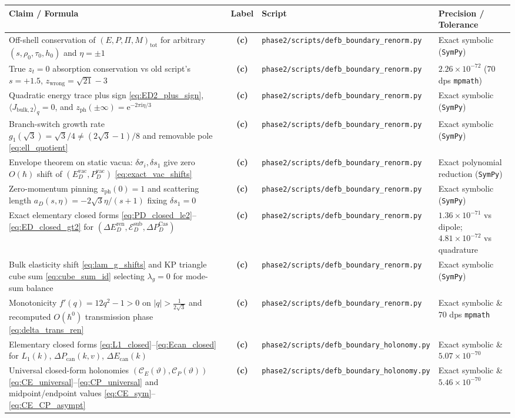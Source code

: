 \documentclass[11pt,a4paper]{article}
\theoremstyle{remark}
\newcommand{\hb}{\hbar}
\newcommand{\ii}{\mathrm{i}}
\newcommand{\ee}{\mathrm{e}}
\newcommand{\Lc}{\textbf{(c)}}
\newcommand{\sren}{\texttt{phase2/\allowbreak scripts/\allowbreak defb\_\allowbreak boundary\_\allowbreak renorm.py}}
\newcommand{\shol}{\texttt{phase2/\allowbreak scripts/\allowbreak defb\_\allowbreak boundary\_\allowbreak holonomy.py}}
\begin{document}
\begin{longtable}{@{}L{5.6cm}cL{3.8cm}L{4.8cm}@{}}
\toprule
Claim / Formula & Label & Script & Precision / Tolerance \\\midrule\endhead
Off-shell conservation of $(E,P,\Pi,M)_{\mathrm{tot}}$ for arbitrary $(s,\rho_0,\tau_0,h_0)$ and $\eta=\pm 1$ & \Lc & \sren & Exact symbolic (\texttt{SymPy}) \\
True $z_t=0$ absorption conservation vs old script's $s=+1.5$, $z_{\mathrm{wrong}}=\sqrt{21}-3$ & \Lc & \sren & $2.26\times 10^{-72}$ ($70$ dps \texttt{mpmath}) \\
Quadratic energy trace plus sign \eqref{eq:ED2_plus_sign}, $\langle J_{\mathrm{bulk},2}\rangle_q=0$, and $z_{\mathrm{ph}}(\pm\infty)=\ee^{-2\pi\ii\eta/3}$ & \Lc & \sren & Exact symbolic (\texttt{SymPy}) \\
Branch-switch growth rate $g_1(\sqrt{3})=\sqrt{3}/4 \ne (2\sqrt{3}-1)/8$ and removable pole \eqref{eq:ell_quotient} & \Lc & \sren & Exact symbolic (\texttt{SymPy}) \\
Envelope theorem on static vacua: $\delta\sigma_i,\delta s_1$ give zero $O(\hb)$ shift of $(E_D^{\mathrm{vac}},P_D^{\mathrm{vac}})$ \eqref{eq:exact_vac_shifts} & \Lc & \sren & Exact polynomial reduction (\texttt{SymPy}) \\
Zero-momentum pinning $z_{\mathrm{ph}}(0)=1$ and scattering length $a_D(s,\eta)=-2\sqrt{3}\eta/(s+1)$ fixing $\delta s_1=0$ & \Lc & \sren & Exact symbolic (\texttt{SymPy}) \\
Exact elementary closed forms \eqref{eq:PD_closed_le2}--\eqref{eq:ED_closed_gt2} for $(\Delta E_D^{\mathrm{ren}},\mathcal{E}_D^{\mathrm{sub}},\Delta P_D^{\mathrm{Cas}})$ & \Lc & \sren & $1.36\times 10^{-71}$ vs dipole; $4.81\times 10^{-72}$ vs quadrature \\
Bulk elasticity shift \eqref{eq:lam_g_shifts} and KP triangle cube sum \eqref{eq:cube_sum_id} selecting $\lambda_g=0$ for mode-sum balance & \Lc & \sren & Exact symbolic (\texttt{SymPy}) \\
Monotonicity $f'(q)=12q^2-1>0$ on $|q|>\frac{1}{2\sqrt{3}}$ and recomputed $O(\hb^0)$ transmission phase \eqref{eq:delta_trans_ren} & \Lc & \sren & Exact symbolic \& $70$ dps \texttt{mpmath} \\
Elementary closed forms \eqref{eq:L1_closed}--\eqref{eq:Ecan_closed} for $L_1(k)$, $\Delta P_{\mathrm{can}}(k,v)$, $\Delta E_{\mathrm{can}}(k)$ & \Lc & \shol & Exact symbolic \& $5.07\times 10^{-70}$ \\
Universal closed-form holonomies $(\mathcal{C}_E(\vartheta),\mathcal{C}_P(\vartheta))$ \eqref{eq:CE_universal}--\eqref{eq:CP_universal} and midpoint/endpoint values \eqref{eq:CE_sym}--\eqref{eq:CE_CP_asympt} & \Lc & \shol & Exact symbolic \& $5.46\times 10^{-70}$ \\

\end{longtable}
\end{document}
